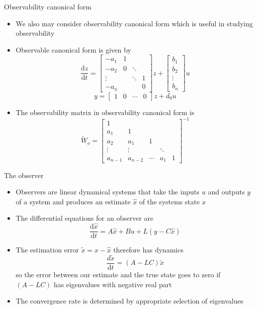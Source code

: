\documentclass{beamer-control}
\begin{document}
\begin{frame}{Observability canonical form}
	\begin{itemize}
		\item We also may consider observability canonical form which is useful in studying observability
		\item Observable canonical form is given by 
		\small{\[\frac{\mathrm{d}z}{\mathrm{d}t} = \begin{bmatrix}
			-a_1 & 1 & & \\
			 -a_2 & 0 & \ddots & \\ \vdots & & \ddots & 1\\
			  -a_n & & & 0
		\end{bmatrix}z + \begin{bmatrix}
			b_1 \\ b_2 \\ \vdots \\ b_n
		\end{bmatrix} u \]
		\[y=\begin{bmatrix}
			1 & 0  & \cdots & 0
		\end{bmatrix}z + d_0u\]}
		\item The observability matrix in observability canonical form is 
		\small{\[\tilde{W}_o = \begin{bmatrix}
			1 & & & & \\
			a_1 & 1& & & \\
			a_2 & a_1 & 1 & & \\
			\vdots & \vdots & & \ddots & \\
			a_{n-1} & a_{n-2} & \cdots & a_1 & 1
		\end{bmatrix}^{-1}\]}
	\end{itemize}
\end{frame}


\begin{frame}{The observer}
\begin{itemize}
\item Observers are linear dynamical systems that take the inputs $u$ and outputs $y$ of a system and produces an estimate $\hat{x}$ of the systems state $x$
\item The differential equations for an observer are
\[\frac{\mathrm{d}\hat{x}}{\mathrm{d}t} = A\hat{x}+Bu+L(y-C\hat{x})\]
\item The estimation error $\tilde{x}=x-\hat{x}$ therefore has dynamics
\[\frac{d\tilde{x}}{\mathrm{d}t} = (A-LC)\tilde{x}\]
so the error between our estimate and the true state goes to zero if $(A-LC)$ has eigenvalues with negative real part
\item The convergence rate is determined by appropriate selection of eigenvalues
\end{itemize}
\end{frame}
\end{document}
